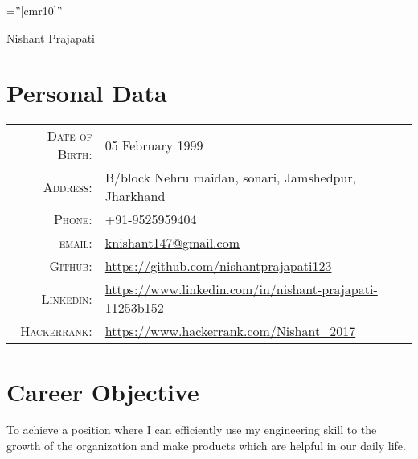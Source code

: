 \documentclass[a4paper,10pt]{article}
\begin{document}

\pagestyle{empty} %

\font\fb=''[cmr10]'' %

\par{\centering
		{\Huge Nishant Prajapati
	}\bigskip\par}

\section{Personal Data}

\begin{tabular}{rl}
    \textsc{Date of Birth:} & 05 February 1999 \\
    \textsc{Address:}   & B/block Nehru maidan, sonari, Jamshedpur, Jharkhand \\
    \textsc{Phone:}     & +91-9525959404\\
    \textsc{email:}     & \href{mailto:knishant147@gmail.com}{knishant147@gmail.com}\\
    \textsc{Github:}    & \url{https://github.com/nishantprajapati123}\\
    \textsc{Linkedin:}  &\url{https://www.linkedin.com/in/nishant-prajapati-11253b152}\\
    \textsc{Hackerrank:}&\url{https://www.hackerrank.com/Nishant_2017}
\end{tabular}

\section{Career Objective}
\footnotesize{To achieve a position where I can efficiently use my engineering skill to the growth of the organization and make
products which are helpful in our daily life.}

\end{document}
